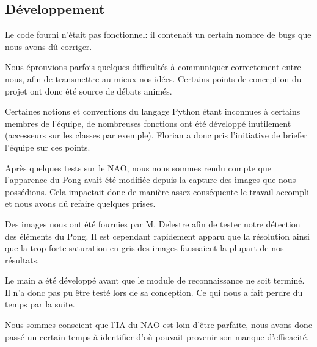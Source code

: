 \subsection{Développement}
  \par Le code fourni n'était pas fonctionnel: il contenait un certain nombre de bugs que nous avons dû corriger.
  \par Nous éprouvions parfois quelques difficultés à communiquer correctement entre nous, afin de transmettre au mieux nos idées.
  Certains points de conception du projet ont donc été source de débats animés.
  \par Certaines notions et conventions du langage Python étant inconnues à certains membres de l'équipe, de nombreuses fonctions ont été développé inutilement (accesseurs sur les classes par exemple).
  Florian a donc pris l’initiative de briefer l’équipe sur ces points.
  \par Après quelques tests sur le NAO, nous nous sommes rendu compte que l’apparence du Pong avait été modifiée depuis la capture des images que nous possédions.
  Cela impactait donc de manière assez conséquente le travail accompli et nous avons dû refaire quelques prises.
  \par Des images nous ont été fournies par M. Delestre afin de tester notre détection des éléments du Pong.
  Il est cependant rapidement apparu que la résolution ainsi que la trop forte saturation en gris des images faussaient la plupart de nos résultats.
  \par Le main a été développé avant que le module de reconnaissance ne soit terminé.
  Il n’a donc pas pu être testé lors de sa conception.
  Ce qui nous a fait perdre du temps par la suite.
  \par Nous sommes conscient que l'IA du NAO est loin d'être parfaite, nous avons donc passé un certain temps à identifier d'où pouvait provenir son manque d'efficacité.

\pagebreak
